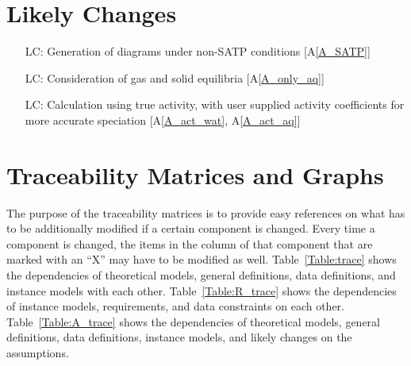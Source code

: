 \documentclass[12pt]{article}
\newcommand{\aref}[1]{A\ref{#1}}
\newcounter{lcnum} %
\begin{document}
\section{Likely Changes}    

\noindent \begin{itemize}

\item[LC\refstepcounter{lcnum}\thelcnum\label{LC_SATP}:] Generation of diagrams under non-SATP conditions [\aref{A_SATP}]
\item[LC\refstepcounter{lcnum}\thelcnum\label{LC_state}:] Consideration of gas and solid equilibria [\aref{A_only_aq}]
\item[LC\refstepcounter{lcnum}\thelcnum\label{LC_act}:] Calculation using true activity, with user supplied activity coefficients for more accurate speciation [\aref{A_act_wat}, \aref{A_act_aq}] 


\end{itemize}


\section{Traceability Matrices and Graphs}

The purpose of the traceability matrices is to provide easy references on what
has to be additionally modified if a certain component is changed.  Every time a
component is changed, the items in the column of that component that are marked
with an ``X'' may have to be modified as well.  Table~\ref{Table:trace} shows the
dependencies of theoretical models, general definitions, data definitions, and
instance models with each other. Table~\ref{Table:R_trace} shows the
dependencies of instance models, requirements, and data constraints on each
other. Table~\ref{Table:A_trace} shows the dependencies of theoretical models,
general definitions, data definitions, instance models, and likely changes on
the assumptions.
\end{document}

